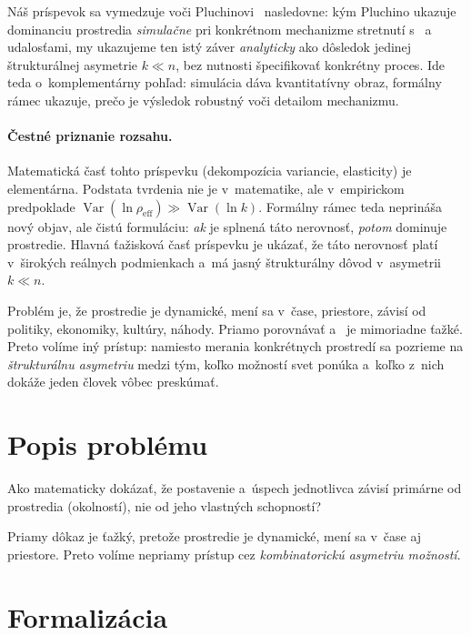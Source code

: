 \documentclass[12pt,a4paper]{article}
\begin{document}
Náš príspevok sa vymedzuje voči Pluchinovi~\cite{pluchino2018} nasledovne: kým Pluchino ukazuje dominanciu prostredia \emph{simulačne} pri konkrétnom mechanizme stretnutí s~ a~ udalosťami, my ukazujeme ten istý záver \emph{analyticky} ako dôsledok jedinej štrukturálnej asymetrie $k \ll n$, bez nutnosti špecifikovať konkrétny proces. Ide teda o~komplementárny pohľad: simulácia dáva kvantitatívny obraz, formálny rámec ukazuje, prečo je výsledok robustný voči detailom mechanizmu.

\paragraph{Čestné priznanie rozsahu.} Matematická časť tohto príspevku (dekompozícia variancie, elasticity) je elementárna. Podstata tvrdenia nie je v~matematike, ale v~empirickom predpoklade $\operatorname{Var}(\ln \rho_{\text{eff}}) \gg \operatorname{Var}(\ln k)$. Formálny rámec teda neprináša nový objav, ale čistú formuláciu: \emph{ak} je splnená táto nerovnosť, \emph{potom} dominuje prostredie. Hlavná ťažisková časť príspevku je ukázať, že táto nerovnosť platí v~širokých reálnych podmienkach a~má jasný štrukturálny dôvod v~asymetrii $k \ll n$.

Problém je, že prostredie je dynamické, mení sa v~čase, priestore, závisí od politiky, ekonomiky, kultúry, náhody. Priamo porovnávať  a~ je mimoriadne ťažké. Preto volíme iný prístup: namiesto merania konkrétnych prostredí sa pozrieme na \emph{štrukturálnu asymetriu} medzi tým, koľko možností svet ponúka a~koľko z~nich dokáže jeden človek vôbec preskúmať.

\section{Popis problému}

Ako matematicky dokázať, že postavenie a~úspech jednotlivca závisí primárne od prostredia (okolností), nie od jeho vlastných schopností?

Priamy dôkaz je ťažký, pretože prostredie je dynamické, mení sa v~čase aj priestore. Preto volíme nepriamy prístup cez \emph{kombinatorickú asymetriu možností}.

\section{Formalizácia}
\end{document}

